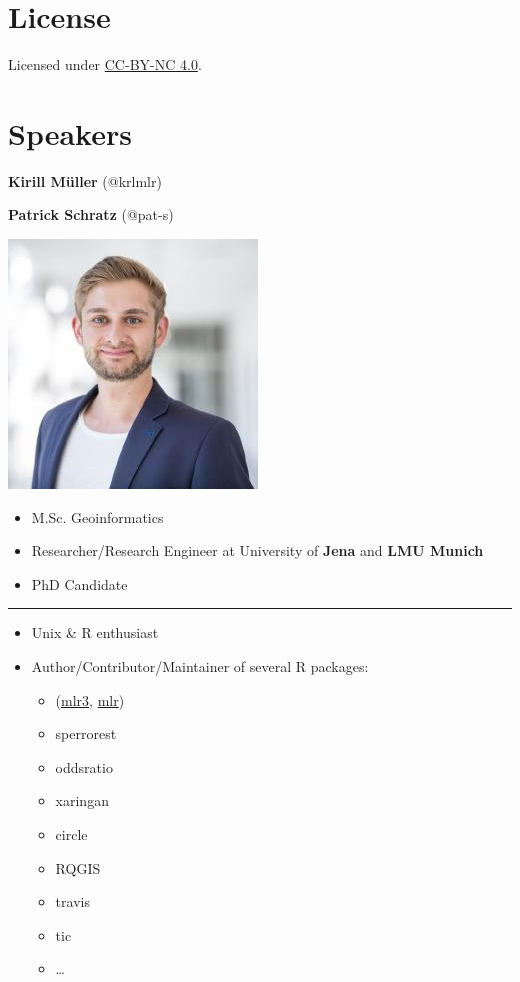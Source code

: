 \documentclass[]{book}
\providecommand{\tightlist}{%
  \setlength{\itemsep}{0pt}\setlength{\parskip}{0pt}}
\begin{document}
\hypertarget{license}{%
\section*{License}\label{license}}

Licensed under \href{https://creativecommons.org/licenses/by-nc/4.0/}{CC-BY-NC 4.0}.

\hypertarget{speakers}{%
\section{Speakers}\label{speakers}}

\textbf{Kirill Müller} (@krlmlr)

\textbf{Patrick Schratz} (@pat-s)

\begin{flushright}\includegraphics{img/pjs} \end{flushright}

\begin{itemize}
\tightlist
\item
  M.Sc. Geoinformatics
\item
  Researcher/Research Engineer at University of \textbf{Jena} and \textbf{LMU Munich}
\item
  PhD Candidate
\end{itemize}

\begin{center}\rule{0.5\linewidth}{\linethickness}\end{center}

\begin{itemize}
\tightlist
\item
  Unix \& R enthusiast
\item
  Author/Contributor/Maintainer of several R packages:

  \begin{itemize}
  \tightlist
  \item
    (\href{https://github.com/mlr-org/mlr3}{mlr3}, \href{https://github.com/mlr-org/mlr}{mlr})
  \item
    sperrorest
  \item
    oddsratio
  \item
    xaringan
  \item
    circle
  \item
    RQGIS
  \item
    travis
  \item
    tic
  \item
    \ldots{}
  \end{itemize}
\end{itemize}
\end{document}
